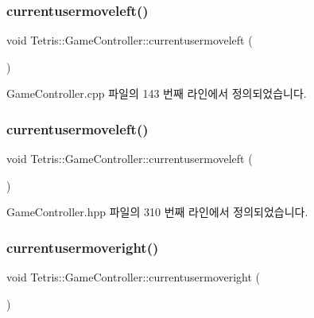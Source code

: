 \subsubsection{\texorpdfstring{currentusermoveleft()}{currentusermoveleft()}\hspace{0.1cm}{\footnotesize\ttfamily [1/2]}}
{\footnotesize\ttfamily void Tetris\+::\+Game\+Controller\+::currentusermoveleft (\begin{DoxyParamCaption}{ }\end{DoxyParamCaption})}



Game\+Controller.\+cpp 파일의 143 번째 라인에서 정의되었습니다.

\mbox{\label{class_tetris_1_1_game_controller_ac0d40a0936505754131099034b4271fa}} 
\subsubsection{\texorpdfstring{currentusermoveleft()}{currentusermoveleft()}\hspace{0.1cm}{\footnotesize\ttfamily [2/2]}}
{\footnotesize\ttfamily void Tetris\+::\+Game\+Controller\+::currentusermoveleft (\begin{DoxyParamCaption}{ }\end{DoxyParamCaption})\hspace{0.3cm}{\ttfamily [inline]}}



Game\+Controller.\+hpp 파일의 310 번째 라인에서 정의되었습니다.

\mbox{\label{class_tetris_1_1_game_controller_a1d2859507cbc9bf9789753228cdedc1f}} 
\subsubsection{\texorpdfstring{currentusermoveright()}{currentusermoveright()}\hspace{0.1cm}{\footnotesize\ttfamily [1/2]}}
{\footnotesize\ttfamily void Tetris\+::\+Game\+Controller\+::currentusermoveright (\begin{DoxyParamCaption}{ }\end{DoxyParamCaption})}




